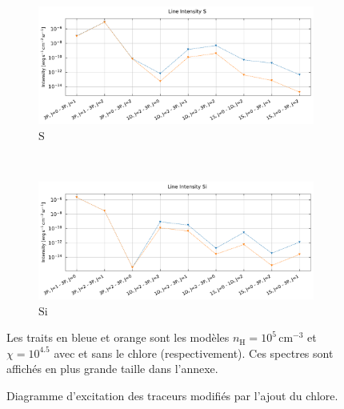 \begin{figure}[!h]
    \begin{subfigure}[t]{0.49\textwidth} %
        \centering \includegraphics[trim = {0 0 0 1cm},clip,width=1\textwidth]{figure/Cl/gridModelEmiss/I_comp_S.pdf}
        \caption{$\mathrm{S}$}
    \end{subfigure}
    ~
    \begin{subfigure}[t]{0.49\textwidth} %
        \centering \includegraphics[trim = {0 0 0 1cm},clip,width=1\textwidth]{figure/Cl/gridModelEmiss/I_comp_Si.pdf}
        \caption{$\mathrm{Si}$}
    \end{subfigure}
    
    \caption{Diagramme d'excitation des traceurs modifiés par l'ajout du chlore.}
    \begin{minipage}{\textwidth}
    Les traits en bleue et orange sont les modèles $n_\mathrm{H}=10^5 \, \mathrm{cm}^{-3}$ et $\chi=10^{4.5}$ avec et sans le chlore (respectivement). Ces spectres sont affichés en plus grande taille dans l'annexe.
    \end{minipage}
    \label{fig:Cl:gridModelEmiss:yes}
\end{figure}




